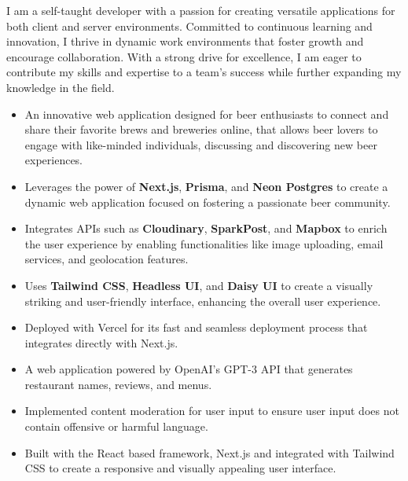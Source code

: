 \documentclass[10pt,letterpaper,withhyper]{altacv}
\begin{document}

\makecvheader
{}

\begin{paracol}{2}
	I am a self-taught developer with a passion for creating versatile applications for both client and server environments. Committed to continuous learning and innovation, I thrive in dynamic work environments that foster growth and encourage collaboration. With a strong drive for excellence, I am eager to contribute my skills and expertise to a team's success while further expanding my knowledge in the field.
	
  \begin{itemize}
    \item An innovative web application designed for beer enthusiasts to connect and share their favorite brews and breweries online, that allows beer lovers to engage with like-minded individuals, discussing and discovering new beer experiences.
    \item Leverages the power of \textbf{Next.js}, \textbf{Prisma}, and \textbf{Neon Postgres} to create a dynamic web application focused on fostering a passionate beer community.
    \item Integrates APIs such as \textbf{Cloudinary}, \textbf{SparkPost}, and \textbf{Mapbox} to enrich the user experience by enabling functionalities like image uploading, email services, and geolocation features.
    \item Uses \textbf{Tailwind CSS}, \textbf{Headless UI}, and \textbf{Daisy UI} to create a visually striking and user-friendly interface, enhancing the overall user experience.  
    \item Deployed with Vercel for its fast and seamless deployment process that integrates directly with Next.js.
  \end{itemize}
  
  \divider
  
	\begin{itemize}
		\item A web application powered by OpenAI's GPT-3 API that generates restaurant names, reviews, and menus.
		\item Implemented content moderation for user input to ensure user input does not contain offensive or harmful language.
		\item Built with the React based framework, Next.js and integrated with Tailwind CSS to create a responsive and visually appealing user interface.
	\end{itemize}
	  

\end{paracol}
\end{document}
